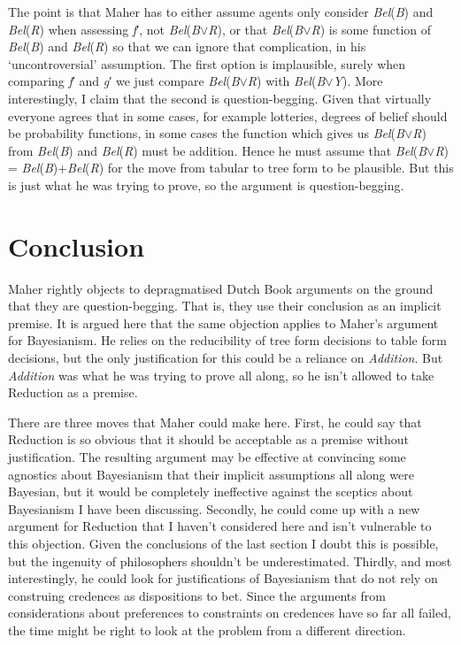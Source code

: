 \documentclass[
  11pt,
  letterpaper,
  DIV=11,
  numbers=noendperiod,
  twoside]{scrartcl}
\begin{document}
The point is that Maher has to either assume agents only consider
\emph{Bel}(\emph{B}) and \emph{Bel}(\emph{R}) when assessing \emph{f}′,
not \emph{Bel}(\emph{B}\({\vee}\)\emph{R}), or that
\emph{Bel}(\emph{B}\({\vee}\)\emph{R}) is some function of
\emph{Bel}(\emph{B}) and \emph{Bel}(\emph{R}) so that we can ignore that
complication, in his `uncontroversial' assumption. The first option is
implausible, surely when comparing \emph{f}′ and \emph{g}′ we just
compare \emph{Bel}(\emph{B}\({\vee}\)\emph{R}) with
\emph{Bel}(\emph{B}\({\vee}\)\emph{Y}). More interestingly, I claim that
the second is question-begging. Given that virtually everyone agrees
that in some cases, for example lotteries, degrees of belief should be
probability functions, in some cases the function which gives us
\emph{Bel}(\emph{B}\({\vee}\)\emph{R}) from \emph{Bel}(\emph{B}) and
\emph{Bel}(\emph{R}) must be addition. Hence he must assume that
\emph{Bel}(\emph{B}\({\vee}\)\emph{R}) =
\emph{Bel}(\emph{B})+\emph{Bel}(\emph{R}) for the move from tabular to
tree form to be plausible. But this is just what he was trying to prove,
so the argument is question-begging.

\section{Conclusion}\label{conclusion}

Maher rightly objects to depragmatised Dutch Book arguments on the
ground that they are question-begging. That is, they use their
conclusion as an implicit premise. It is argued here that the same
objection applies to Maher's argument for Bayesianism. He relies on the
reducibility of tree form decisions to table form decisions, but the
only justification for this could be a reliance on \emph{Addition}. But
\emph{Addition} was what he was trying to prove all along, so he isn't
allowed to take Reduction as a premise.

There are three moves that Maher could make here. First, he could say
that Reduction is so obvious that it should be acceptable as a premise
without justification. The resulting argument may be effective at
convincing some agnostics about Bayesianism that their implicit
assumptions all along were Bayesian, but it would be completely
ineffective against the sceptics about Bayesianism I have been
discussing. Secondly, he could come up with a new argument for Reduction
that I haven't considered here and isn't vulnerable to this objection.
Given the conclusions of the last section I doubt this is possible, but
the ingenuity of philosophers shouldn't be underestimated. Thirdly, and
most interestingly, he could look for justifications of Bayesianism that
do not rely on construing credences as dispositions to bet. Since the
arguments from considerations about preferences to constraints on
credences have so far all failed, the time might be right to look at the
problem from a different direction.
\end{document}
